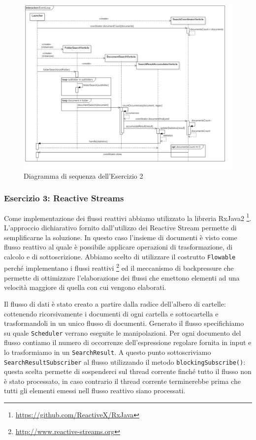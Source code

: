 ﻿\documentclass[a4paper]{article}
\begin{document}
\begin{figure}[H]

    \centering

    \includegraphics[width=\linewidth, height=\textheight,keepaspectratio]{EventLoop}

    \caption{Diagramma di sequenza dell'Esercizio 2}

    \label{fig:event-loop}

\end{figure}

\subsubsection{Esercizio 3: Reactive Streams}

Come implementazione dei flussi reattivi abbiamo utilizzato la libreria RxJava2 \footnote{\url{https://github.com/ReactiveX/RxJava}}.
%
L'approccio dichiarativo fornito dall'utilizzo dei Reactive Stream permette di semplificarne la soluzione.
%
In questo caso l'insieme di documenti \`e visto come flusso reattivo al quale \`e possibile applicare operazioni di trasformazione, di calcolo e di sottoscrizione.
%
Abbiamo scelto di utilizzare il costrutto \texttt{Flowable} perch\'e implementano i flussi reattivi \footnote{\url{http://www.reactive-streams.org}} ed il meccanismo di backpressure che permette di ottimizzare l'elaborazione dei flussi che emettono elementi ad una velocit\`a maggiore di quella con cui vengono elaborati.

Il flusso di dati \`e stato creato a partire dalla radice dell'albero di cartelle: cottenendo ricorsivamente i documenti di ogni cartella e sottocartella e trasformandoli in un unico flusso di documenti.
%
Generato il flusso specifichiamo su quale \texttt{Scheduler} verrano eseguite le manipolazioni.
%
Per ogni documento del flusso contiamo il numero di occorrenze dell'espressione regolare fornita in input e lo trasformiamo in un \texttt{SearchResult}.
%
A questo punto sottoscriviamo \texttt{SearchResultSubscriber} al flusso utilizzando il metodo \texttt{blockingSubscribe()}: questa scelta permette di sospenderci sul thread corrente finch\'e tutto il flusso non \`e stato processato, in caso contrario il thread corrente terminerebbe prima che tutti gli elementi emessi nell flusso reattivo siano processati.
\end{document}
